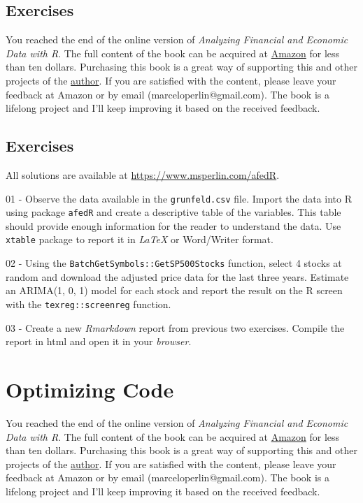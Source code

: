 \documentclass[
  12pt,
]{book}
\newenvironment{pleasebuyit}
{\begin{noteblock}
		
	} {\end{noteblock}}
\begin{document}
\hypertarget{exercises-13}{%
\section{Exercises}\label{exercises-13}}

\begin{pleasebuyit}
You reached the end of the online version of \emph{Analyzing Financial
and Economic Data with R}. The full content of the book can be acquired
at \href{https://www.amazon.com/dp/B084LSNXMN}{Amazon} for less than ten
dollars. Purchasing this book is a great way of supporting this and
other projects of the \href{https://www.msperlin.com/}{author}. If you
are satisfied with the content, please leave your feedback at Amazon or
by email (marceloperlin@gmail.com). The book is a lifelong project and
I'll keep improving it based on the received feedback.
\end{pleasebuyit}

\hypertarget{exercises-14}{%
\section{Exercises}\label{exercises-14}}

All solutions are available at \url{https://www.msperlin.com/afedR}.

01 -
Observe the data available in the \texttt{grunfeld.csv} file. Import the data into R using package \texttt{afedR} and create a descriptive table of the variables. This table should provide enough information for the reader to understand the data. Use \texttt{xtable} package to report it in \emph{LaTeX} or Word/Writer format.

02 -
Using the \texttt{BatchGetSymbols::GetSP500Stocks} function, select 4 stocks at random and download the adjusted price data for the last three years. Estimate an ARIMA(1, 0, 1) model for each stock and report the result on the R screen with the \texttt{texreg::screenreg} function.

03 -
Create a new \emph{Rmarkdown} report from previous two exercises. Compile the report in html and open it in your \emph{browser}.

\hypertarget{optimizing}{%
\chapter{Optimizing Code}\label{optimizing}}

\begin{pleasebuyit}
You reached the end of the online version of \emph{Analyzing Financial
and Economic Data with R}. The full content of the book can be acquired
at \href{https://www.amazon.com/dp/B084LSNXMN}{Amazon} for less than ten
dollars. Purchasing this book is a great way of supporting this and
other projects of the \href{https://www.msperlin.com/}{author}. If you
are satisfied with the content, please leave your feedback at Amazon or
by email (marceloperlin@gmail.com). The book is a lifelong project and
I'll keep improving it based on the received feedback.
\end{pleasebuyit}
\end{document}
